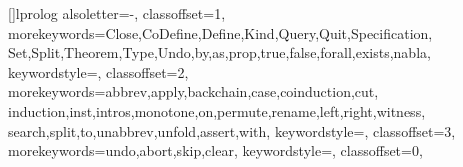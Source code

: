 \newcommand{\ie}{i.e.}
\newcommand{\etc}{etc}
\newcommand{\eg}{e.g.}
\newcommand{\lP}{$\lambda$Prolog\xspace}

\newcommand{\LKF}{\hbox{\sl LKF}\xspace}
\newcommand{\LJF}{\hbox{\sl LJF}\xspace}

\newcommand{\fpccoq}{FPC-Coq\xspace}




[]{lprolog}{%
  alsoletter={-},
  classoffset=1,%
  morekeywords={Close,CoDefine,Define,Kind,Query,Quit,Specification,
    Set,Split,Theorem,Type,Undo,by,as,prop,true,false,forall,exists,nabla},%
  keywordstyle=\color{abellatop},%
  classoffset=2,%
  morekeywords={abbrev,apply,backchain,case,coinduction,cut,
    induction,inst,intros,monotone,on,permute,rename,left,right,witness,
    search,split,to,unabbrev,unfold,assert,with},%
  keywordstyle=\color{abellatac},%
  classoffset=3,%
  morekeywords={undo,abort,skip,clear},%
  keywordstyle=\color{abellabad}\underbar,%
  classoffset=0,%
}

\lstset{%
  basicstyle=\ttfamily,%
  breakatwhitespace=true,breaklines=true,%
  language=abella,%
  commentstyle=\itshape,%
  xleftmargin=5pt,
  rangeprefix=/*\ ,
  rangesuffix=\ */,
  includerangemarker=false,
}

